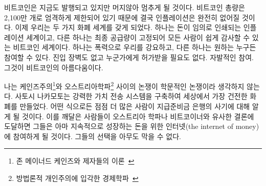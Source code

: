 \begin{comment}
	While Bitcoin is still inflationary, it will cease to be so rather soon.
	The strictly limited supply of 21 million bitcoins will eventually do
	away with inflation completely. We now have two monetary worlds: an
	inflationary one where money is printed arbitrarily, and the world of
	Bitcoin, where final supply is fixed and easily auditable for everyone.
	One is forced upon us by violence, the other can be joined by anyone who
	wishes to do so. No barriers to entry, no one to ask for permission.
	Voluntary participation. That is the beauty of Bitcoin.
\end{comment}
비트코인은 지금도 발행되고 있지만 머지않아 멈추게 될 것이다. 
비트코인 총량은 2,100만 개로 엄격하게 제한되어 있기 때문에 결국 인플레이션은 완전히 없어질 것이다.
이제 우리는 두 가지 화폐 세계를 갖게 되었다. 
하나는 돈이 임의로 인쇄되는 인플레이션 세계이고, 다른 하나는 최종 공급량이 고정되어 모든 사람이 쉽게 감사할 수 있는 비트코인 세계이다.
하나는 폭력으로 우리를 강요하고, 다른 하나는 원하는 누구든 참여할 수 있다.
진입 장벽도 없고 누군가에게 허가받을 필요도 없다. 
자발적인 참여. 그것이 비트코인의 아름다움이다.

\begin{comment}
	I would argue that the argument between Keynesian\footnote{Theories according to
		John Maynard Keynes and his deciples~\cite{wiki:keynesian}} and
	Austrian\footnote{School of economic thought based on methodological
		individualism~\cite{wiki:austrian}} economists is no longer purely academical.
	Satoshi managed to build a system for value transfer on steroids, creating the
	soundest money which ever existed in the process. One way or another, more and
	more people will learn about the scam which is fractional reserve banking. If
	they come to similar conclusions as most Austrians and Bitcoiners, they might
	join the ever-growing internet of money. Nobody can stop them if they choose to
	do so.
\end{comment}
나는 케인즈주의\footnote{존 메이너드 케인즈와 제자들의 이론~\cite{wiki:keynesian}}와 오스트리아학파\footnote{방법론적 개인주의에 입각한 경제학파~\cite{wiki:austrian}} 사이의 논쟁이 학문적인 논쟁이라 생각하지 않는다. 
사토시 나카모토는 강력한 가치 전송 시스템을 구축하여 세상에서 가장 건전한 화폐를 만들었다. 
어떤 식으로든 점점 더 많은 사람이 지급준비금 은행의 사기에 대해 알게 될 것이다. 
이를 깨달은 사람들이 오스트리아 학파나 비트코이너와 유사한 결론에 도달하면 
그들은 아마 지속적으로 성장하는 돈을 위한 인터넷(the internet of money)에 참여하게 될 것이다. 
그들의 선택을 아무도 막을 수 없다.

